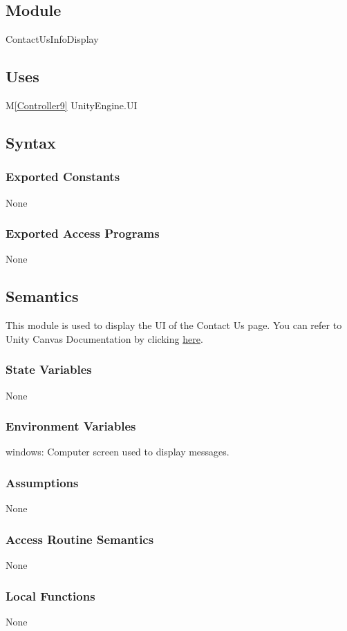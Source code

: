 \documentclass[12pt, titlepage]{article}
\newcommand{\mref}[1]{M\ref{#1}}
\begin{document}
\subsection{Module}
ContactUsInfoDisplay

\subsection{Uses}
\mref{Controller9} 
UnityEngine.UI

\subsection{Syntax}
\subsubsection{Exported Constants}
None
\subsubsection{Exported Access Programs}
None

\subsection{Semantics}
This module is used to display the UI of the Contact Us page.
You can refer to Unity Canvas Documentation by clicking 
\href{https://docs.unity3d.com/Packages/com.unity.ugui@1.0/manual/class-Canvas.html}{here}.

\subsubsection{State Variables}
None
\subsubsection{Environment Variables}
windows: Computer screen used to display messages.
\subsubsection{Assumptions}
None
\subsubsection{Access Routine Semantics}
None
\subsubsection{Local Functions}
None
\end{document}
